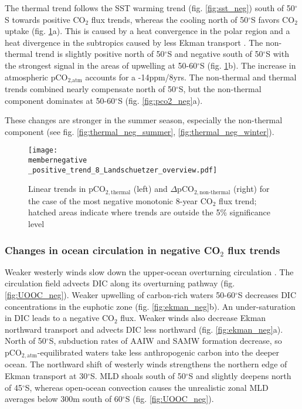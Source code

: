 \documentclass[12pt]{article}
\newcommand{\membernegative}{m143_1995_2002}
\begin{document}
The thermal trend follows the SST warming trend (fig. \ref{fig:sst_neg}) south of 50$^\circ$S towards positive CO$_2$ flux trends, whereas the cooling north of 50$^\circ$S favors CO$_2$ uptake (fig. \ref{fig:thermal_neg}a). This is caused by a heat convergence in the polar region and a heat divergence in the subtropics caused by less Ekman transport \citep{Hall2002}. The non-thermal trend is slightly positive north of 50$^\circ$S and negative south of 50$^\circ$S with the strongest signal in the areas of upwelling at 50-60$^\circ$S (fig. \ref{fig:thermal_neg}b). The increase in atmospheric pCO$_{\text{2,atm}}$ accounts for a -14ppm/8yrs. The non-thermal and thermal trends combined nearly compensate  north of 50$^\circ$S, but the non-thermal component dominates at 50-60$^\circ$S (fig. \ref{fig:pco2_neg}a). 

These changes are stronger in the summer season, especially the non-thermal component (see fig. \ref{fig:thermal_neg_summer}, \ref{fig:thermal_neg_winter}). 

\begin{figure}[h!]
\centering
	\texttt{[image: \\membernegative \_positive\_trend\_8\_Landschuetzer\_overview.pdf]}
	\caption{Linear trends in pCO$_{2,\text{thermal}}$ (left) and $\Delta$pCO$_{2,\text{non-thermal}}$ (right) for the case of the most negative monotonic 8-year CO$_2$ flux trend; hatched areas indicate where trends are outside the 5\% significance level}
	\label{fig:thermal_neg}
\end{figure}
 





\clearpage

\subsubsection{Changes in ocean circulation in negative CO$_2$ flux trends}
\label{sec:trends_neg_circulation}

Weaker westerly winds slow down the upper-ocean overturning circulation \citep{Lauderdale2013}. The circulation field advects DIC along its overturning pathway (fig. \ref{fig:UOOC_neg}). Weaker upwelling of carbon-rich waters 50-60$^\circ$S decreases DIC concentrations in the euphotic zone (fig. \ref{fig:ekman_neg}b). An under-saturation in DIC leads to a negative CO$_2$ flux. Weaker winds also decrease Ekman northward transport and advects DIC less northward (fig. \ref{fig:ekman_neg}a). North of 50$^\circ$S, subduction rates of AAIW and SAMW formation decrease, so pCO$_{2,\text{atm}}$-equilibrated waters take less anthropogenic carbon into the deeper ocean. The northward shift of westerly winds strengthens the northern edge of Ekman transport at 30$^\circ$S. MLD shoals south of 50$^\circ$S and slightly deepens north of 45$^\circ$S, whereas open-ocean convection causes the unrealistic zonal MLD averages below 300m south of 60$^\circ$S  (fig. \ref{fig:UOOC_neg}). 
\end{document}
